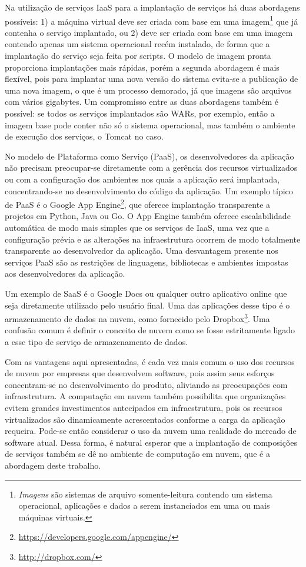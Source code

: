 Na utilização de serviços IaaS para a implantação de serviços há duas abordagens possíveis:
1) a máquina virtual deve ser criada com base em uma 
imagem\footnote{\emph{Imagens} são sistemas de arquivo somente-leitura contendo um sistema operacional, aplicações e dados a serem instanciados em uma ou mais máquinas virtuais.} 
que já contenha
o serviço implantado, ou 2) deve ser criada com base em uma imagem contendo apenas um
sistema operacional recém instalado, de forma que a implantação do serviço seja feita
por scripts. O modelo de imagem pronta proporciona implantações mais rápidas,
porém a segunda abordagem é mais flexível, pois para implantar uma nova versão do sistema
evita-se a publicação de uma nova imagem, o que é um processo demorado,
já que imagens são arquivos com vários gigabytes.
Um compromisso entre as duas abordagens também é possível:
se todos os serviços implantados são WARs, por exemplo, então a imagem base
pode conter não só o sistema operacional, mas também o ambiente de execução
dos serviços, o Tomcat no caso.

No modelo de Plataforma como Serviço (PaaS), os desenvolvedores da aplicação não precisam preocupar-se diretamente com a gerência dos recursos virtualizados ou com a configuração dos ambientes nos quais a aplicação será implantada, concentrando-se no desenvolvimento do código da aplicação.
Um exemplo típico de PaaS é o Google App Engine\footnote{\url{https://developers.google.com/appengine/}}, que oferece implantação transparente a projetos em Python, Java ou Go. O App Engine também oferece escalabilidade automática de modo mais simples que os serviços de IaaS, uma vez que a configuração prévia e as alterações na infraestrutura ocorrem de modo totalmente transparente ao desenvolvedor da aplicação. Uma desvantagem presente nos serviços PaaS são as restrições de linguagens, bibliotecas e ambientes impostas aos desenvolvedores da aplicação.

Um exemplo de SaaS é o Google Docs ou qualquer outro aplicativo online que seja diretamente utilizado pelo usuário final. Uma das aplicações desse tipo é o armazenamento de dados na nuvem, como fornecido pelo Dropbox\footnote{\url{http://dropbox.com/}}. Uma confusão comum é definir o conceito de nuvem como se fosse estritamente ligado a esse tipo de serviço de armazenamento de dados.

Com as vantagens aqui apresentadas, é cada vez mais comum o uso dos recursos de nuvem por empresas que desenvolvem software, pois assim seus esforços concentram-se no desenvolvimento do produto, aliviando as preocupações com infraestrutura. A computação em nuvem também possibilita que organizações evitem grandes investimentos antecipados em infraestrutura, pois os recursos virtualizados são dinamicamente acrescentados conforme a carga da aplicação requeira. Pode-se então considerar o uso da nuvem uma realidade do mercado de software atual. Dessa forma, é natural esperar que a implantação de composições de serviços também se dê no ambiente de computação em nuvem, que é a abordagem deste trabalho. 

